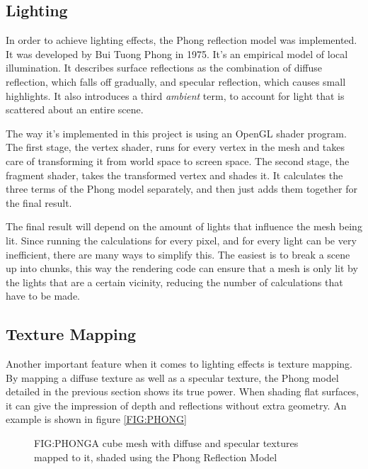 
\subsection{Lighting}

In order to achieve lighting effects,
the Phong reflection model was implemented.
It was developed by Bui Tuong Phong in 1975\cite{phong}.
It's an empirical model of local illumination.
It describes surface reflections as the combination of diffuse reflection,
which falls off gradually,
and specular reflection,
which causes small highlights.
It also introduces a third \textit{ambient} term,
to account for light that is scattered about an entire scene.

The way it's implemented in this project is using an OpenGL shader program.
The first stage, the vertex shader,
runs for every vertex in the mesh and takes care of transforming it from world space to screen space.
The second stage, the fragment shader,
takes the transformed vertex and shades it.
It calculates the three terms of the Phong model separately,
and then just adds them together for the final result.

The final result will depend on the amount of lights that influence the mesh being lit.
Since running the calculations for every pixel,
and for every light can be very inefficient,
there are many ways to simplify this.
The easiest is to break a scene up into chunks,
this way the rendering code can ensure that a mesh is only lit by the lights that are a certain vicinity,
reducing the number of calculations that have to be made.

\subsection{Texture Mapping}

Another important feature when it comes to lighting effects is texture mapping.
By mapping a diffuse texture as well as a specular texture,
the Phong model detailed in the previous section shows its true power.
When shading flat surfaces,
it can give the impression of depth and reflections without extra geometry.
An example is shown in figure \ref{FIG:PHONG}

\begin{figure}[Phong lighting with texture mapping]{FIG:PHONG}{A cube mesh with diffuse and specular textures mapped to it, shaded using the Phong Reflection Model}
\end{figure}

